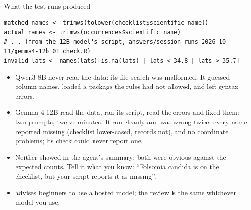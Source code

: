 \documentclass[11pt,aspectratio=169]{beamer}
\begin{document}
\begin{frame}[fragile]{What the test runs produced}
  \begin{lstlisting}[basicstyle=\ttfamily\scriptsize]
matched_names <- trimws(tolower(checklist$scientific_name))
actual_names <- trimws(occurrences$scientific_name)
# ... (from the 12B model's script, answers/session-runs-2026-10-11/gemma4-12b_01_check.R)
invalid_lats <- names(lats)[is.na(lats) | lats < 34.8 | lats > 35.7]
  \end{lstlisting}
  \small
  \begin{itemize}
    \item Qwen3 8B never read the data: its file search was malformed. It guessed column names, loaded a package the rules had not allowed, and left syntax errors.
    \item Gemma 4 12B read the data, ran its script, read the errors and fixed them: two prompts, twelve minutes. It ran cleanly and was wrong twice: every name reported missing (checklist lower-cased, records not), and no coordinate problems; its check could never report one.
    \item Neither showed in the agent's summary; both were obvious against the expected counts. Tell it what you know: ``Folsomia candida is on the checklist, but your script reports it as missing''.
    \item \textcite{wickham2026nobs} advises beginners to use a hosted model; the review is the same whichever model you use.
  \end{itemize}
\end{frame}
\end{document}
